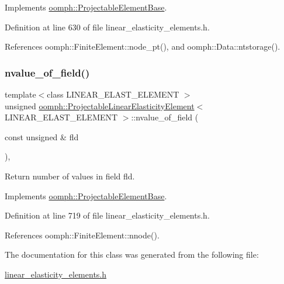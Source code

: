 Implements \hyperlink{classoomph_1_1ProjectableElementBase_ac6790f394630b964663281f8740f43a5}{oomph\+::\+Projectable\+Element\+Base}.



Definition at line 630 of file linear\+\_\+elasticity\+\_\+elements.\+h.



References oomph\+::\+Finite\+Element\+::node\+\_\+pt(), and oomph\+::\+Data\+::ntstorage().

\mbox{\label{classoomph_1_1ProjectableLinearElasticityElement_ab63ab6edb80671b16a1e9de95de439b1}} 
\subsubsection{\texorpdfstring{nvalue\+\_\+of\+\_\+field()}{nvalue\_of\_field()}}
{\footnotesize\ttfamily template$<$class L\+I\+N\+E\+A\+R\+\_\+\+E\+L\+A\+S\+T\+\_\+\+E\+L\+E\+M\+E\+NT $>$ \\
unsigned \hyperlink{classoomph_1_1ProjectableLinearElasticityElement}{oomph\+::\+Projectable\+Linear\+Elasticity\+Element}$<$ L\+I\+N\+E\+A\+R\+\_\+\+E\+L\+A\+S\+T\+\_\+\+E\+L\+E\+M\+E\+NT $>$\+::nvalue\+\_\+of\+\_\+field (\begin{DoxyParamCaption}\item[{const unsigned \&}]{fld }\end{DoxyParamCaption})\hspace{0.3cm}{\ttfamily [inline]}, {\ttfamily [virtual]}}



Return number of values in field fld. 



Implements \hyperlink{classoomph_1_1ProjectableElementBase_a1a9a6de16f3511bca8e8be770abb9c2e}{oomph\+::\+Projectable\+Element\+Base}.



Definition at line 719 of file linear\+\_\+elasticity\+\_\+elements.\+h.



References oomph\+::\+Finite\+Element\+::nnode().



The documentation for this class was generated from the following file\+:\begin{DoxyCompactItemize}
\item 
\hyperlink{linear__elasticity__elements_8h}{linear\+\_\+elasticity\+\_\+elements.\+h}\end{DoxyCompactItemize}
